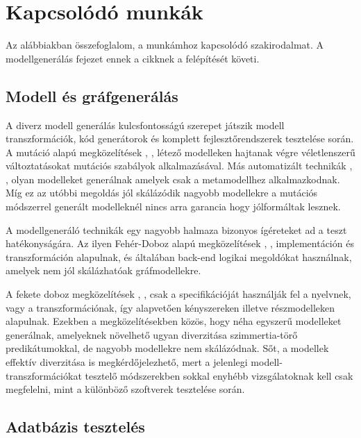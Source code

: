 \chapter{Kapcsolódó munkák}

Az alábbiakban összefoglalom, a munkámhoz kapcsolódó szakirodalmat. A modellgenerálás fejezet ennek \cite{semerath2018iterative} a cikknek a felépítését követi.  

\section{Modell és gráfgenerálás}

A diverz modell generálás kulcsfontosságú szerepet játszik modell transzformációk, kód generátorok és komplett fejlesztőrendszerek tesztelése során. A mutáció alapú megközelítések \cite{aranega2015towards}, \cite{darabos2008towards},  létező modelleken hajtanak végre véletlenszerű változtatásokat mutációs szabályok alkalmazásával. Más automatizált technikák  \cite{brottier2006metamodel}, \cite{ehrig2009generating}, olyan modelleket generálnak amelyek csak a metamodellhez alkalmazkodnak. Míg ez  az utóbbi megoldás jól skálázódik nagyobb modellekre a mutációs módszerrel generált  modelleknél nincs arra  garancia hogy jólformáltak lesznek.

A modellgeneráló technikák egy nagyobb halmaza bizonyos ígéreteket ad a teszt hatékonyságára. Az ilyen Fehér-Doboz alapú megközelítések \cite{aranega2015towards}, \cite{bordbar2005uml2alloy}, implementáción és transzformáción alapulnak, és általában back-end logikai megoldókat használnak, amelyek nem jól skálázhatóak gráfmodellekre.

A fekete doboz megközelítések \cite{buttner2012verification}, \cite{fleurey2007towards}, csak a specifikációját használják fel a nyelvnek, vagy a transzformációnak, így alapvetően  kényszereken illetve részmodelleken alapulnak. Ezekben a megközelítésekben közös, hogy néha egyszerű modelleket generálnak, amelyeknek   növelhető ugyan diverzitása szimmertia-törő predikátumokkal, de nagyobb modellekre nem skálázódnak. Sőt,  a modellek effektív diverzitása is megkérdőjelezhető, mert a jelenlegi modell- transzformációkat tesztelő módszerekben sokkal enyhébb vizsgálatoknak kell csak megfelelni, mint a különböző szoftverek tesztelése során.

\section{Adatbázis tesztelés}

